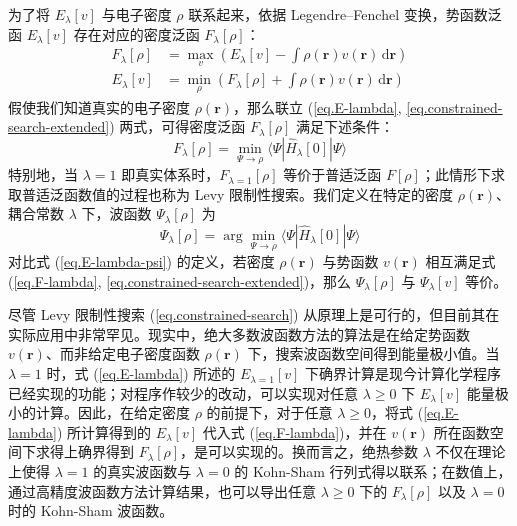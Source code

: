 为了将 $E_\lambda [v]$ 与电子密度 $\rho$ 联系起来，依据 Legendre–Fenchel 变换，势函数泛函 $E_\lambda [v]$ 存在对应的密度泛函 $F_\lambda [\rho]$\cite{Lieb-Lieb.IJQC.1983, Teale-Helgaker.JCP.2009}：
\begin{align}
  \label{eq.F-lambda}
  F_\lambda [\rho] &= \max_v \left( E_\lambda [v] - \int \rho(\bm{r}) v(\bm{r}) \, \mathrm{d} \bm{r} \right) \\
  \label{eq.constrained-search-extended}
  E_\lambda [v] &= \min_\rho \left( F_\lambda [\rho] + \int \rho(\bm{r}) v(\bm{r}) \, \mathrm{d} \bm{r} \right)
\end{align}
假使我们知道真实的电子密度 $\rho(\bm{r})$，那么联立 (\ref{eq.E-lambda}, \ref{eq.constrained-search-extended}) 两式，可得密度泛函 $F_\lambda [\rho]$ 满足下述条件：
\begin{equation}
  \label{eq.constrained-search}
  F_\lambda[\rho] = \min_{\Psi \rightarrow \rho} \langle \Psi | \hat H_\lambda [0] | \Psi \rangle
\end{equation}
特别地，当 $\lambda = 1$ 即真实体系时，$F_{\lambda=1} [\rho]$ 等价于普适泛函 $F[\rho]$；此情形下求取普适泛函数值的过程也称为 Levy 限制性搜索\cite{Levy-Levy.PNAS.1979}。我们定义在特定的密度 $\rho(\bm{r})$、耦合常数 $\lambda$ 下，波函数 $\Psi_\lambda [\rho]$ 为
\begin{equation}
  \Psi_\lambda [\rho] = \arg \min_{\Psi \rightarrow \rho} \langle \Psi | \hat H_\lambda [0] | \Psi \rangle
\end{equation}
对比式 (\ref{eq.E-lambda-psi}) 的定义，若密度 $\rho(\bm{r})$ 与势函数 $v(\bm{r})$ 相互满足式 (\ref{eq.F-lambda}, \ref{eq.constrained-search-extended})，那么 $\Psi_\lambda [\rho]$ 与 $\Psi_\lambda [v]$ 等价。

尽管 Levy 限制性搜索 (\ref{eq.constrained-search}) 从原理上是可行的，但目前其在实际应用中非常罕见。现实中，绝大多数波函数方法的算法是在给定势函数 $v(\bm{r})$、而非给定电子密度函数 $\rho(\bm{r})$ 下，搜索波函数空间得到能量极小值。当 $\lambda=1$ 时，式 (\ref{eq.E-lambda}) 所述的 $E_{\lambda=1} [v]$ 下确界计算是现今计算化学程序已经实现的功能；对程序作较少的改动，可以实现对任意 $\lambda \geqslant 0$ 下 $E_\lambda [v]$ 能量极小的计算。因此，在给定密度 $\rho$ 的前提下，对于任意 $\lambda \geqslant 0$，将式 (\ref{eq.E-lambda}) 所计算得到的 $E_\lambda [v]$ 代入式 (\ref{eq.F-lambda})，并在 $v(\bm{r})$ 所在函数空间下求得上确界得到 $F_\lambda[\rho]$，是可以实现的\cite{Teale-Helgaker.JCP.2009}。换而言之，绝热参数 $\lambda$ 不仅在理论上使得 $\lambda = 1$ 的真实波函数与 $\lambda = 0$ 的 Kohn-Sham 行列式得以联系；在数值上，通过高精度波函数方法计算结果，也可以导出任意 $\lambda \geqslant 0$ 下的 $F_\lambda [\rho]$ 以及 $\lambda = 0$ 时的 Kohn-Sham 波函数。

